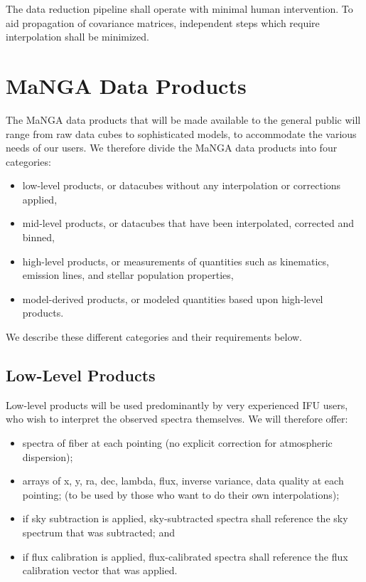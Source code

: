 \documentclass[preprint,11pt]{aastex}
\begin{document}
\medskip
\noindent The data reduction pipeline shall operate with minimal human
intervention.  To aid propagation of covariance matrices, independent
steps which require interpolation shall be minimized.


\section{MaNGA Data Products} \label{sec:data_products}

The MaNGA data products that will be made available to the general
public will range from raw data cubes to sophisticated models, to
accommodate the various needs of our users. We therefore divide the
MaNGA data products into four categories:

\begin{itemize}
\item low-level products, or datacubes without any
  interpolation or corrections applied,
\item mid-level products, or datacubes that have been interpolated,
  corrected and binned,
\item high-level products, or measurements of quantities such as
  kinematics, emission lines, and stellar population properties,
\item model-derived products, or modeled quantities based upon
  high-level products.
\end{itemize}

\noindent
We describe these different categories and their requirements below.


\subsection{Low-Level Products} \label{sec:low_level_products}

Low-level products will be used predominantly by very experienced IFU
users, who wish to interpret the observed spectra themselves. We will
therefore offer:

\begin{itemize}
\item spectra of fiber at each pointing (no explicit correction for
  atmospheric dispersion);
\item arrays of x, y, ra, dec, lambda, flux, inverse variance, data
  quality at each pointing; (to be used by those who want to do their
  own interpolations);
\item if sky subtraction is applied, sky-subtracted spectra shall
  reference the sky spectrum that was subtracted; and
\item if flux calibration is applied, flux-calibrated spectra shall
   reference the flux calibration vector that was applied.
\end{itemize} 
\end{document}
